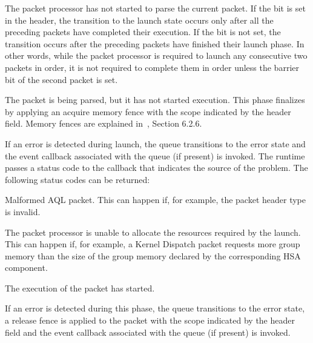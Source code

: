 \documentclass[final,oneside]{book}
\begin{document}
\begin{description}[itemsep=2pt,leftmargin=0cm, labelindent=0cm] \item[In queue]
The packet processor has not started to parse the current packet. If the
 bit is set in the header, the transition to
the launch state occurs only after all the preceding packets have completed
their execution. If the  bit is not set, the
transition occurs after the preceding packets have finished their launch phase.
In other words, while the packet processor is required to launch any consecutive
two packets in order, it is not required to complete them in order unless the
barrier bit of the second packet is set.

\item[Launch] The packet is being parsed, but it has not started execution. This
  phase finalizes by applying an acquire memory fence with the scope indicated
  by the  header field.  Memory
  fences are explained in~\cite{prm}, Section 6.2.6.

  If an error is detected during launch, the queue transitions to the error
  state and the event callback associated with the queue (if present) is
  invoked. The runtime passes a status code to the callback that indicates the
  source of the problem.  The following status codes can be returned:
  \begin{description}[itemsep=1.5pt,labelindent=.5cm]
  \item[\hsaref{HSA_STATUS_ERROR_INVALID_PACKET_FORMAT}] Malformed AQL
    packet. This can happen if, for example, the packet header type is invalid.
  \item[\hsaref{HSA_STATUS_ERROR_OUT_OF_RESOURCES}] The packet processor is
    unable to allocate the resources required by the launch. This can happen
    if, for example, a Kernel Dispatch packet requests more group memory than
    the size of the group memory declared by the corresponding HSA component.
  \end{description}
\item[Active] The execution of the packet has started.

  If an error is detected during this phase, the queue transitions to the error
  state, a release fence is applied to the packet with the scope indicated by
  the  header field and the
  event callback associated with the queue (if present) is invoked.


\end{description}
\end{document}
